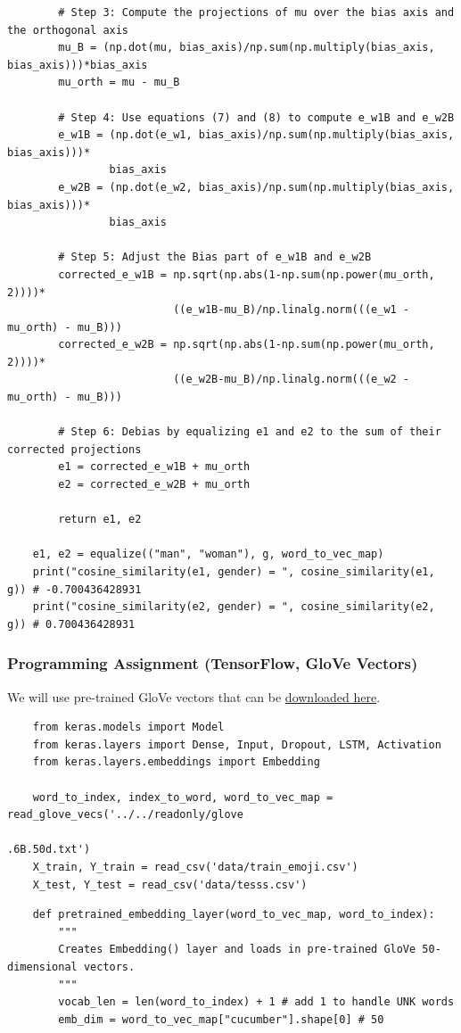 \documentclass[11pt, a4paper]{article}
\begin{document}
\begin{spacing}{1.1}
\begin{lstlisting}
		# Step 3: Compute the projections of mu over the bias axis and the orthogonal axis
		mu_B = (np.dot(mu, bias_axis)/np.sum(np.multiply(bias_axis, bias_axis)))*bias_axis
		mu_orth = mu - mu_B
		
		# Step 4: Use equations (7) and (8) to compute e_w1B and e_w2B
		e_w1B = (np.dot(e_w1, bias_axis)/np.sum(np.multiply(bias_axis, bias_axis)))*
		        bias_axis
		e_w2B = (np.dot(e_w2, bias_axis)/np.sum(np.multiply(bias_axis, bias_axis)))*
		        bias_axis
		
		# Step 5: Adjust the Bias part of e_w1B and e_w2B 
		corrected_e_w1B = np.sqrt(np.abs(1-np.sum(np.power(mu_orth, 2))))*
		                  ((e_w1B-mu_B)/np.linalg.norm(((e_w1 - mu_orth) - mu_B)))
		corrected_e_w2B = np.sqrt(np.abs(1-np.sum(np.power(mu_orth, 2))))*
		                  ((e_w2B-mu_B)/np.linalg.norm(((e_w2 - mu_orth) - mu_B)))
		
		# Step 6: Debias by equalizing e1 and e2 to the sum of their corrected projections
		e1 = corrected_e_w1B + mu_orth
		e2 = corrected_e_w2B + mu_orth
		
		return e1, e2	
	
	e1, e2 = equalize(("man", "woman"), g, word_to_vec_map)
	print("cosine_similarity(e1, gender) = ", cosine_similarity(e1, g)) # -0.700436428931
	print("cosine_similarity(e2, gender) = ", cosine_similarity(e2, g)) # 0.700436428931
	\end{lstlisting} \newpage
	
	\subsubsection{Programming Assignment (TensorFlow, GloVe Vectors)}
	We will use pre-trained GloVe vectors that can be \href{https://nlp.stanford.edu/projects/glove/}{downloaded here}. 
	\begin{lstlisting}
	from keras.models import Model
	from keras.layers import Dense, Input, Dropout, LSTM, Activation
	from keras.layers.embeddings import Embedding
		
	word_to_index, index_to_word, word_to_vec_map = read_glove_vecs('../../readonly/glove
	                                                                 .6B.50d.txt')
	X_train, Y_train = read_csv('data/train_emoji.csv')
	X_test, Y_test = read_csv('data/tesss.csv')	\end{lstlisting}
	
	\begin{lstlisting}
	def pretrained_embedding_layer(word_to_vec_map, word_to_index):
		"""
		Creates Embedding() layer and loads in pre-trained GloVe 50-dimensional vectors.
		"""
		vocab_len = len(word_to_index) + 1 # add 1 to handle UNK words               
		emb_dim = word_to_vec_map["cucumber"].shape[0] # 50


\end{lstlisting}
\end{spacing}
\end{document}
